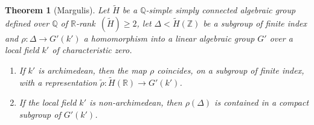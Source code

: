 \documentclass[10pt,a4paper]{amsart}
\newtheorem{theorem}{Theorem}
\theoremstyle{definition}
\newcommand{\field}[1]{\mathbb{#1}}
\newcommand{\Q}{\field{Q}}
\newcommand{\R}{\field{R}}
\newcommand{\Z}{\field{Z}}
\begin{document}
\setcounter{theorem}{8}
\begin{theorem}[Margulis]\label{super-rigid} Let $\tilde{H}$ be a $\Q$-simple simply connected algebraic group defined over $\Q$ of $\R$-rank~$(\tilde H)\geq 2$, let $\Delta < \tilde{H}(\Z)$ be a subgroup of finite index and $\rho : \Delta \to G'(k')$ a homomorphism into a linear algebraic group $G'$ over a local field $k'$ of characteristic zero.

\begin{enumerate}
\item If $k'$ is archimedean, then the map $\rho $ coincides, on a subgroup of finite
index, with a representation $\tilde \rho: \tilde H(\R) \to G'(k')$.

\item If the local
field $k'$ is non-archimedean, then $\rho (\Delta)$ is contained in a
compact subgroup of $G'(k')$.
\end{enumerate}
\end{theorem}
\end{document}
